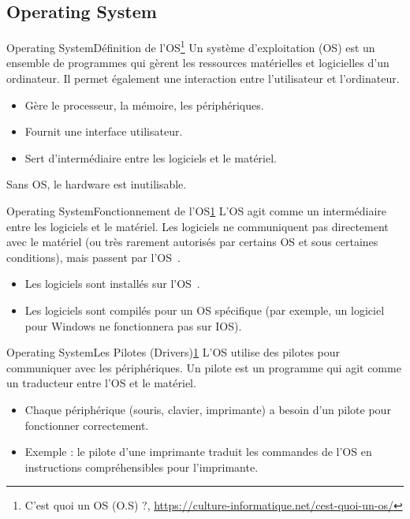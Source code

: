 \documentclass{beamer}
\begin{document}
    \subsection{Operating System}\label{subsec:os}

    \begin{frame}{Operating System}{Définition de l'OS\footnote{\label{os}C’est quoi un OS (O.S) ?, \url{https://culture-informatique.net/cest-quoi-un-os/}}}
        Un système d'exploitation (OS) est un ensemble de programmes qui gèrent les ressources matérielles et logicielles d'un ordinateur.
        Il permet également une interaction entre l'utilisateur et l'ordinateur.
        \begin{itemize}
            \item Gère le processeur, la mémoire, les périphériques.
            \item Fournit une interface utilisateur.
            \item Sert d'intermédiaire entre les logiciels et le matériel.
        \end{itemize}
        \bigbreak
        Sans OS, le hardware est inutilisable.
    \end{frame}

    \begin{frame}{Operating System}{Fonctionnement de l'OS\cref{os}}
        L'OS agit comme un intermédiaire entre les logiciels et le matériel.
        Les logiciels ne communiquent pas directement avec le matériel (ou très rarement autorisés par certains OS et sous certaines conditions), mais passent par l'OS~.
        \begin{itemize}
            \item Les logiciels sont installés sur l'OS~.
            \item Les logiciels sont compilés pour un OS spécifique (par exemple, un logiciel pour Windows ne fonctionnera pas sur IOS).
        \end{itemize}
    \end{frame}

    \begin{frame}{Operating System}{Les Pilotes (Drivers)\cref{os}}
        L'OS utilise des pilotes pour communiquer avec les périphériques.
        Un pilote est un programme qui agit comme un traducteur entre l'OS et le matériel.
        \begin{itemize}
            \item Chaque périphérique (souris, clavier, imprimante) a besoin d'un pilote pour fonctionner correctement.
            \item Exemple : le pilote d'une imprimante traduit les commandes de l'OS en instructions compréhensibles pour l'imprimante.
        \end{itemize}
    \end{frame}
\end{document}
